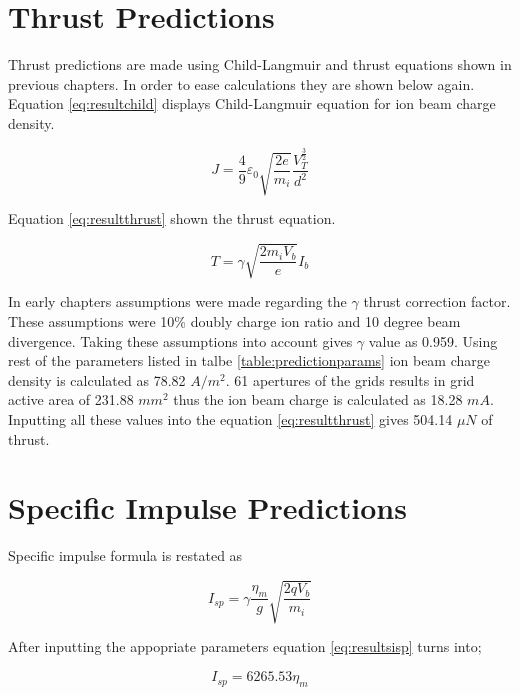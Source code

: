 \section{Thrust Predictions}

Thrust predictions are made using Child-Langmuir and thrust equations shown in previous chapters. In order to ease calculations they are shown below again. 
Equation \ref{eq:resultchild} displays Child-Langmuir equation for ion beam charge density. 

\begin{equation}
    J = \frac{4}{9}\varepsilon_0 \sqrt{\frac{2e}{m_i}}\frac{V_T^{\frac{3}{2}}}{d^2}
    \label{eq:resultchild}
\end{equation}

Equation \ref{eq:resultthrust} shown the thrust equation.

\begin{equation}
    T = \gamma \sqrt{\dfrac{2m_i V_b}{e}}I_b
    \label{eq:resultthrust}
\end{equation}

In early chapters assumptions were made regarding the $\gamma$ thrust correction factor. These assumptions were 10\% doubly charge ion ratio and 10 degree beam divergence. Taking these assumptions into account gives $\gamma$ value as 0.959. Using rest of the parameters listed in talbe \ref{table:predictionparams} ion beam charge density is calculated as 78.82 $A/m^2$. 61 apertures of the grids results in grid active area of 231.88 $mm^2$ thus the ion beam charge is calculated as 18.28 $mA$. Inputting all these values into the equation \ref{eq:resultthrust} gives 504.14 $\mu N$ of thrust.

\section{Specific Impulse Predictions}

Specific impulse formula is restated as 

\begin{equation}
    I_{sp} = \gamma \frac{\eta_m}{g} \sqrt{\frac{2qV_b}{m_i}}
    \label{eq:resultsisp}
\end{equation}

After inputting the appopriate parameters equation \ref{eq:resultsisp} turns into;

\begin{equation}
    I_{sp} = 6265.53  \eta_m
    \label{eq:resultsisp2}
\end{equation}

